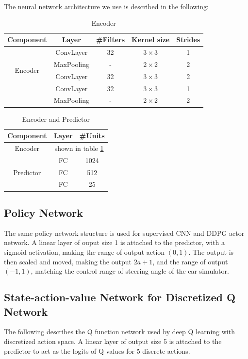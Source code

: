 \documentclass[a4paper]{article}
\begin{document}
The neural network architecture we use is described in the following:

\begin{table}[htbp]
\centering
\begin{tabular}{|c|c|c|c|c|}
\hline
Component & Layer & \#Filters & Kernel size & Strides  \\ \hline
\multirow{4}{*}{Encoder} & ConvLayer & 32 & $3 \times 3$ & 1 \\
 & MaxPooling & -  & $2 \times 2$ & 2  \\
 & ConvLayer & 32 & $3 \times 3$ & 2  \\
 & ConvLayer & 32 & $3 \times 3$ & 1  \\
 & MaxPooling & -  & $2 \times 2$ & 2  \\ \hline
\end{tabular}
\caption{Encoder}
\label{table:nn_encoder}
\end{table}

\begin{table}[htbp]
\centering
\begin{tabular}{|c|c|c|}
\hline
Component & Layer & \#Units   \\ \hline
Encoder & \multicolumn{2}{|c|}{shown in table \ref{table:nn_encoder}} \\ \hline
\multirow{3}{*}{Predictor} & FC & 1024  \\
 & FC & 512   \\
 & FC & 25   \\ \hline
\end{tabular}
\caption{Encoder and Predictor}
\label{table:nn_whole}
\end{table}

\subsection{Policy Network}
The same policy network structure is used for supervised CNN and DDPG actor network. A linear layer of ouput size 1 is attached to the predictor, with a sigmoid activation, making the range of output action $(0,1)$. The output is then scaled and moved, making the output $2a + 1$, and the range of output $(-1,1)$, matching the control range of steering angle of the car simulator.
\subsection{State-action-value Network for Discretized Q Network}
The following describes the Q function network used by deep Q learning with discretized action space. A linear layer of output size 5 is attached to the predictor to act as the logits of Q values for 5 discrete actions.
\end{document}
